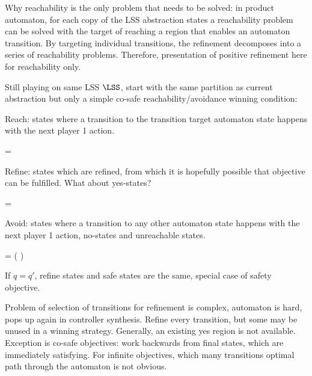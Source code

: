 Why reachability is the only problem that needs to be solved:
in product automaton, for each copy of the LSS abstraction states a reachability problem can be solved with the target of reaching a region that enables an automaton transition.
By targeting individual transitions, the refinement decomposes into a series of reachability problems.
Therefore, presentation of positive refinement here for reachability only.

Still playing on same LSS $\LSS$, start with the same partition as current abstraction but only a simple co-safe reachability/avoidance winning condition:

Reach: states where a transition to the transition target automaton state happens with the next player 1 action.

\startformula
     = 
\stopformula

Refine: states which are refined, from which it is hopefully possible that objective can be fulfilled.
What about yes-states?

\startformula
     = 
\stopformula

Avoid: states where a transition to any other automaton state happens with the next player 1 action, no-states and unreachable states.

\startformula
     =  \setminus \left(  \cup {} \right)
\stopformula

If $q = q'$, refine states and safe states are the same, special case of safety objective.

Problem of selection of transitions for refinement is complex, automaton is hard, pops up again in controller synthesis.
Refine every transition, but some may be unused in a winning strategy.
Generally, an existing yes region is not available.
Exception is co-safe objectives: work backwards from final states, which are immediately satisfying.
For infinite objectives, which many transitions optimal path through the automaton is not obvious.

